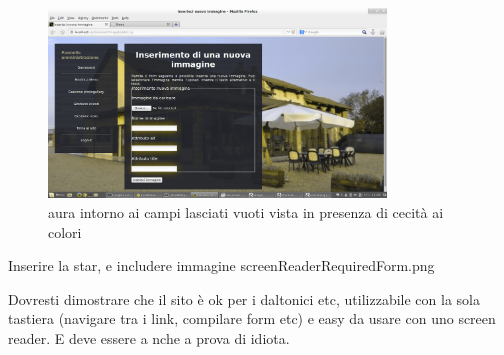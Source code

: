 	\begin{figure}[H]
		\centering \includegraphics[width=0.8\textwidth]{images/color4.png}
		\caption{aura intorno ai campi lasciati vuoti vista in presenza di cecità ai colori}
	\end{figure}
	
Inserire la star, e includere immagine screenReaderRequiredForm.png

Dovresti dimostrare che il sito è ok per i daltonici etc, utilizzabile con la sola tastiera (navigare tra i link, compilare form etc) e easy da usare con uno screen reader. E deve essere a nche a prova di idiota.